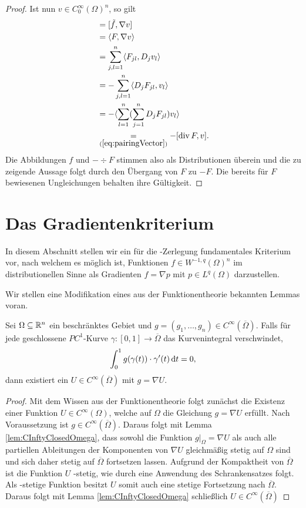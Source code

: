 \begin{proof}
  Ist nun $v \in C_0^\infty(\Omega)^n$, so gilt
  \begin{align*}
    [f,v]
    &= [\tilde f, \nabla v] \\
    &= \langle F, \nabla v\rangle \\
    &= \sum_{j,l=1}^n \langle F_{jl}, D_j v_l \rangle \\
    &= -\sum_{j,l=1}^n \langle D_j F_{jl}, v_l \rangle \\
    &= - \langle \sum_{l = 1}^n ( \sum_{j = 1}^n D_j F_{jl} ) v_l \rangle \\
    &\underset{(\ref{eq:pairingVector})}{=} -[\div F, v]. \\
  \end{align*}
  Die Abbildungen $f$ und $-\div F$ stimmen also als Distributionen überein und die zu zeigende Aussage folgt durch den Übergang von $F$ zu $-F$.
  Die bereits für $F$ bewiesenen Ungleichungen behalten ihre Gültigkeit.
\end{proof}

\newpage
\section{Das Gradientenkriterium}

In diesem Abschnitt stellen wir ein für die \helmholtz\hyp{}Zerlegung fundamentales Kriterium vor, nach welchem es möglich ist, Funktionen $f \in W^{-1,q}(\Omega)^n$ im distributionellen Sinne als Gradienten $f = \nabla p$ mit $p \in L^q(\Omega)$ darzustellen.

Wir stellen eine Modifikation eines aus der Funktionentheorie bekannten Lemmas voran.

\begin{lem}
  \label{lem:existencePotential}
  Sei $\Omega \subseteq \mathbb{R}^n$ ein beschränktes Gebiet und $g = (g_1, \dots, g_n) \in C^\infty(\overline\Omega)$.
  Falls für jede geschlossene $PC^1$-Kurve $\gamma \colon [0,1] \to \overline\Omega$ das Kurvenintegral verschwindet,
$$
  \int_0^1 g(\gamma(t)) \cdot \gamma'(t) \, {\operatorname{d}\!{t}} = 0,  
$$
  dann existiert ein $U\in C^\infty(\overline\Omega)$ mit $g = \nabla U$.
\end{lem}

\begin{proof}
  Mit dem Wissen aus der Funktionentheorie folgt zunächst die Existenz einer Funktion $U \in C^\infty(\Omega)$, welche auf $\Omega$ die Gleichung $g = \nabla U$ erfüllt.
  Nach Voraussetzung ist $g \in C^\infty(\overline\Omega)$.
  Daraus folgt mit Lemma \ref{lem:CInftyClosedOmega}, dass sowohl die Funktion $g|_\Omega = \nabla U$ als auch alle partiellen Ableitungen der Komponenten von $\nabla U$ gleichmäßig stetig auf $\Omega$ sind und sich daher stetig auf $\overline\Omega$ fortsetzen lassen.
  Aufgrund der Kompaktheit von $\overline\Omega$ ist die Funktion $U$ \lipschitz\hyp{}stetig, wie durch eine Anwendung des Schrankensatzes folgt.
  Als \lipschitz\hyp{}stetige Funktion besitzt $U$ somit auch eine stetige Fortsetzung nach $\overline\Omega$.
  Daraus folgt mit Lemma \ref{lem:CInftyClosedOmega} schließlich $U \in C^\infty(\overline\Omega)$ 
\end{proof}

